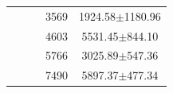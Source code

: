 \begin{table}[t]
\begin{tabular}{ccccc}
                                    &                       &                      & 3569                & 1924.58$\pm$1180.96         \\
                                    &                       &                      & 4603                & 5531.45$\pm$844.10          \\
                                    &                       &                      & 5766                & 3025.89$\pm$547.36          \\
                                    &                       &                      & 7490                & 5897.37$\pm$477.34          \\
    \bottomrule
    \end{tabular}

\end{table}
